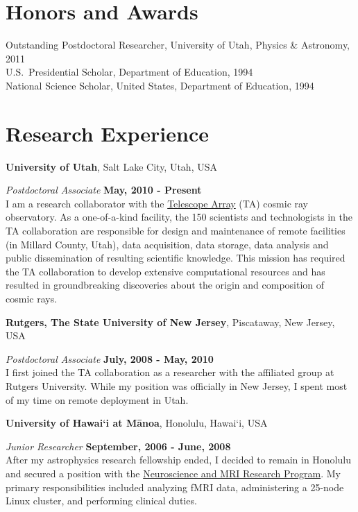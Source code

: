 \begin{resume}
\section{\sc Honors and Awards} 
Outstanding Postdoctoral Researcher, University of Utah, Physics \& Astronomy, 2011\\
U.S.\ Presidential Scholar, Department of Education, 1994\\
National Science Scholar, United States, Department of Education, 1994\\

\section{\sc Research Experience}

{\bf University of Utah}, Salt Lake City, Utah, USA

\vspace{-.3cm}

{\em Postdoctoral Associate} \hfill {\bf May, 2010 - Present}\\
I am a research collaborator with the
    \href{http://www.telescopearray.org}{Telescope Array} (TA)
    cosmic ray observatory. As a one-of-a-kind facility, the 150
    scientists and technologists in the TA collaboration are
    responsible for design and maintenance of remote facilities (in
    Millard County, Utah), data acquisition, data storage, data
    analysis and public dissemination of resulting scientific
    knowledge.  This mission has required the TA collaboration
    to develop extensive computational resources and has resulted in
    groundbreaking discoveries about the origin and composition of
    cosmic rays.
    
{\bf Rutgers, The State University of New Jersey}, Piscataway, New Jersey, USA

\vspace{-.3cm}

{\em Postdoctoral Associate} \hfill {\bf July, 2008 - May, 2010}\\
I first joined the TA collaboration as a researcher
    with the affiliated group at Rutgers University.  While my
    position was officially in New Jersey, I spent most of my time on
    remote deployment in Utah.
    
{\bf University of Hawai`i at M\={a}noa}, Honolulu, Hawai`i, USA

\vspace{-.3cm}
{\em Junior Researcher} \hfill {\bf September, 2006 - June, 2008}\\
After my astrophysics research fellowship ended, I decided
    to remain in Honolulu and secured a position with the
    \href{http://hawaii.edu/mri/home_v6.htm}{Neuroscience and
      MRI Research Program}.  My primary responsibilities
    included analyzing fMRI data, administering a 25-node Linux
    cluster, and performing clinical duties.


\end{resume}
